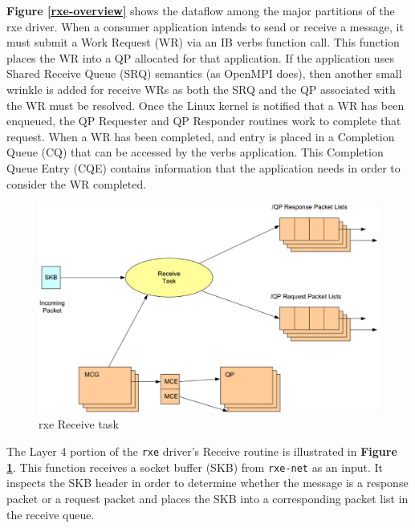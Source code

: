 \documentclass[11pt]{book}
\begin{document}
\textbf{Figure \ref{rxe-overview}} shows the dataflow among the major partitions
of the rxe driver. When a consumer application intends to send or receive a
message, it must submit a Work Request (WR) via an IB verbs function call. This
function places the WR into a QP allocated for that application. If the
application uses Shared Receive Queue (SRQ) semantics (as OpenMPI does), then
another small wrinkle is added for receive WRs as both the SRQ and the QP
associated with the WR must be resolved. Once the Linux kernel is notified that
a WR has been enqueued, the QP Requester and QP Responder routines work to
complete that request. When a WR has been completed, and entry is placed in a
Completion Queue (CQ) that can be accessed by the verbs application. This
Completion Queue Entry (CQE) contains information that the application needs in
order to consider the WR completed.

\begin{figure}[h]
\includegraphics[width=\textwidth]{rxe_recv}
\caption{rxe Receive task \protect\cite{pearson-10}}
\label{rxe-recv}
\end{figure}

The Layer 4 portion of the \verb;rxe; driver's Receive routine is illustrated in
\textbf{Figure \ref{rxe-recv}}. This function receives a socket buffer (SKB)
from \verb;rxe-net; as an input. It inspects the SKB header in order to
determine whether the message is a response packet or a request packet and
places the SKB into a corresponding packet list in the receive queue.
\end{document}
